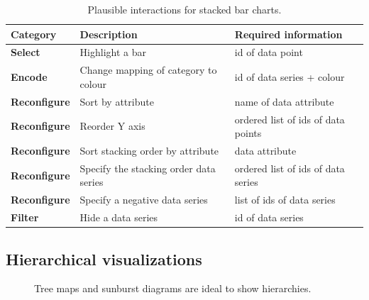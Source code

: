 \begin{table}[H]
  \caption{Plausible interactions for stacked bar charts.}%
  \label{tab:analysis:stacked-bar-chart:interactions}
  \begin{tabular*}{\textwidth}{lll}
    \bf Category & \bf Description & \bf Required information \\
    \hline
    \bf Select & Highlight a bar & id of data point \\
    \bf Encode & Change mapping of category to colour & id of data series + colour \\
    \bf Reconfigure & Sort by attribute & name of data attribute \\
    \bf Reconfigure & Reorder Y axis & ordered list of ids of data points \\
    \bf Reconfigure & Sort stacking order by attribute & data attribute \\
    \bf Reconfigure & Specify the stacking order data series & ordered list of ids of data series \\
    \bf Reconfigure & Specify a negative data series & list of ids of data series \\
    \bf Filter & Hide a data series & id of data series \\
  \end{tabular*}
\end{table}


\subsection{Hierarchical visualizations}

\begin{figure}
  \centering
  \caption{Tree maps and sunburst diagrams are ideal to show hierarchies.}%
  \label{fig:analysis:hierarchies}
  \qquad
\end{figure}

